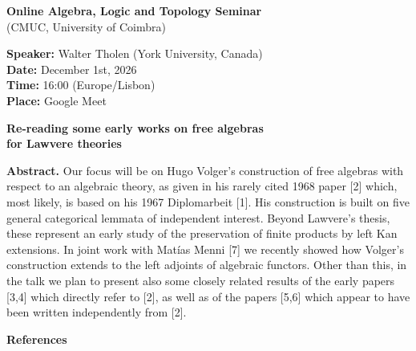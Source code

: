 \documentclass[11pt,a4paper]{article}
\begin{document}
\begin{center}
{\Large\bfseries Online Algebra, Logic and Topology Seminar}\\[4pt]
{\large (CMUC, University of Coimbra)}
\end{center}

\vspace{1em}
\textbf{Speaker:} Walter Tholen (York University, Canada)\\
\textbf{Date:} December 1st, 2026\\
\textbf{Time:} 16:00 (Europe/Lisbon)\\
\textbf{Place:} Google Meet

\vspace{1.5em}
\begin{center}
{\Large\bfseries Re-reading some early works on free algebras\\[3pt]
for Lawvere theories}
\end{center}
\vspace{1em}

\textbf{Abstract.} Our focus will be on Hugo Volger's construction of free algebras with respect to an algebraic theory, as given in his rarely cited 1968 paper [2] which, most likely, is based on his 1967 Diplomarbeit [1]. His construction is built on five general categorical lemmata of independent interest. Beyond Lawvere's thesis, these represent an early study of the preservation of finite products by left Kan extensions. In joint work with Mat\'ias Menni [7] we recently showed how Volger's construction extends to the left adjoints of algebraic functors. Other than this, in the talk we plan to present also some closely related results of the early papers [3,4] which directly refer to [2], as well as of the papers [5,6] which appear to have been written independently from [2].

\bigskip
\textbf{References}
\smallskip
\end{document}

